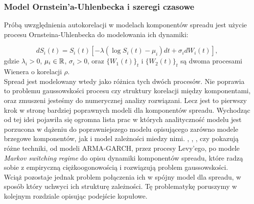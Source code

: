 \subsubsection{Model Ornstein'a-Uhlenbecka i szeregi czasowe}

Próbą uwzględnienia autokorelacji w modelach komponentów spreadu jest użycie procesu Ornsteina-Uhlenbecka do modelowania ich dynamiki:

$$ dS_i(t) =S_i(t)[-\lambda (\log S_i(t) - \mu_i)dt + \sigma_i dW_i(t)],$$
gdzie $\lambda_i>0$,  $\mu_i \in \mathbb{R}$, $\sigma_i >0$, oraz $\{W_1(t)\}_t$ i $\{W_2(t)\}_t$ są dwoma procesami Wienera o korelacji $\rho$.\\

Spread jest modelowany wtedy jako różnica tych dwóch procesów. Nie poprawia to problemu gaussowskości procesu czy struktury korelacji między komponentami, oraz zmuszeni jesteśmy do numerycznej analizy rozwiązani. Lecz jest to pierwszy krok w stronę bardziej poprawnych modeli dla komponentów spreadu. Wychodząc od tej idei pojawiła się ogromna lista prac w których analityczność modelu jest porzucona w dążeniu do poprawniejszego modelu opisującego zarówno modele brzegowe komponentów, jak i model zależności miedzy nimi. \cite{Herath_Copula_Crack_Spread}, \cite{Eyigungor_Markov_Spreads}, \cite{Espen_Crack_Spread_Copula}, czy \cite{Bernard_Pricing_Multivariate_Options_with_copulae} pokazują różne techniki, od modeli ARMA-GARCH, przez procesy Levy'ego, po modele \emph{Markov switching regime} do opisu dynamiki komponentów spreadu, które radzą sobie z empiryczną ciężkoogonowością i rozwiązują problem gaussowskości.\\

Wciąż pozostaje jednak problem połączenia ich w spójny model dla spreadu, w sposób który uchwyci ich strukturę zależności. Tę problematykę poruszymy w kolejnym rozdziale opisując podejście kopułowe.